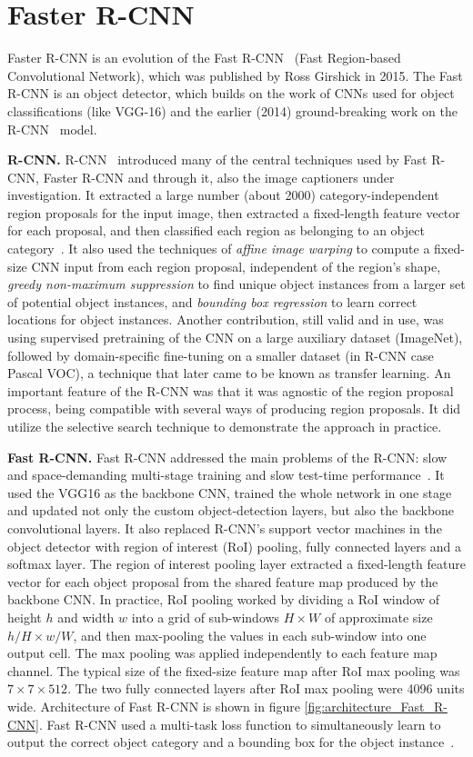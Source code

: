 \documentclass[english,twoside,openright]{HYgraduMLDS}
\begin{document}
\section{Faster R-CNN}
Faster R-CNN is an evolution of the Fast R-CNN~\cite{FastRCNN} (Fast Region-based Convolutional Network), which was published by Ross Girshick in 2015. The Fast R-CNN is an object detector, which builds on the work of CNNs used for object classifications (like VGG-16) and the earlier (2014) ground-breaking work on the R-CNN~\cite{RCNN} model.

\textbf{R-CNN.} R-CNN~\cite{RCNN} introduced many of the central techniques used by Fast R-CNN, Faster R-CNN and through it, also the image captioners under investigation. It extracted a large number (about 2000) category-independent region proposals for the input image, then extracted a fixed-length feature vector for each proposal, and then classified each region as belonging to an object category~\cite{RCNN}. It also used the techniques of \textit{affine image warping} to compute a fixed-size CNN input from each region proposal, independent of the region's shape, \textit{greedy non-maximum suppression} to find unique object instances from a larger set of potential object instances, and \textit{bounding box regression} to learn correct locations for object instances. Another contribution, still valid and in use, was using supervised pretraining of the CNN on a large auxiliary dataset (ImageNet), followed by domain-specific fine-tuning on a smaller dataset (in R-CNN case Pascal VOC), a technique that later came to be known as transfer learning. An important feature of the R-CNN was that it was agnostic of the region proposal process, being compatible with several ways of producing region proposals. It did utilize the selective search technique to demonstrate the approach in practice.

\textbf{Fast R-CNN.} Fast R-CNN addressed the main problems of the R-CNN: slow and space-demanding multi-stage training and slow test-time performance~\cite{FastRCNN}. It used the VGG16 as the backbone CNN, trained the whole network in one stage and updated not only the custom object-detection layers, but also the backbone convolutional layers. It also replaced R-CNN's support vector machines in the object detector with region of interest (RoI) pooling, fully connected layers and a softmax layer. The region of interest pooling layer extracted a fixed-length feature vector for each object proposal from the shared feature map produced by the backbone CNN. In practice, RoI pooling worked by dividing a RoI window of height $h$ and width $w$ into a grid of sub-windows $H \times W$ of approximate size $h/H \times w/W$, and then max-pooling the values in each sub-window into one output cell. The max pooling was applied independently to each feature map channel. The typical size of the fixed-size feature map after RoI max pooling was $7 \times 7 \times 512$. The two fully connected layers after RoI max pooling were 4096 units wide. Architecture of Fast R-CNN is shown in figure \ref{fig:architecture_Fast_R-CNN}. Fast R-CNN used a multi-task loss function to simultaneously learn to output the correct object category and a bounding box for the object instance~\cite{FastRCNN}.
\end{document}
